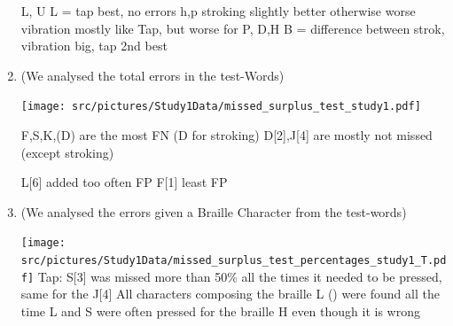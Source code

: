 \begin{enumerate}
\begin{table}[ht]
\caption{Results of Kruskal-Wallis significance tests for the different Braille characters during testing with a $\eta^2$ Effect Size.}
\label{table:learning_significance_results_firstStudy_nonParam}
\end{table}
L, U
L = tap best, no errors
h,p stroking slightly better otherwise worse
vibration mostly like Tap, but worse for P, D,H
B = difference between strok, vibration big, tap 2nd best


    \item (We analysed the total errors in the test-Words)

    \centering
    \texttt{[image: src/pictures/Study1Data/missed\_surplus\_test\_study1.pdf]}


F,S,K,(D) are the most FN (D for stroking)
D[2],J[4] are mostly not missed (except stroking)

L[6] added too often FP
F[1] least FP

    \item (We analysed the errors given a Braille Character from the test-words)
    

        \texttt{[image: src/pictures/Study1Data/missed\_surplus\_test\_percentages\_study1\_T.pdf]}
Tap:
S[3] was missed more than 50\% all the times it needed to be pressed, same for the J[4]
All characters composing the braille L () were found all the time
L and S were often pressed for the braille H even though it is wrong


\end{enumerate}
